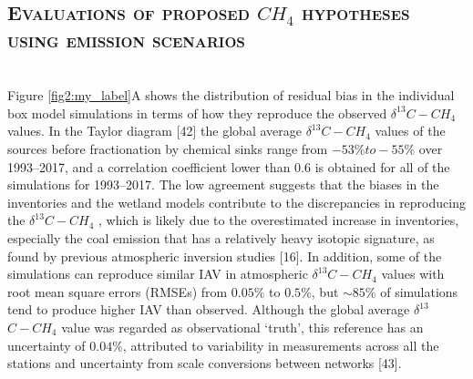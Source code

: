 \documentclass[a4paper,12pt]{article}
\begin{document}
\subsection*{\textbf{\textsc{\large{Evaluations of proposed $CH_{4}$ hypotheses using emission scenarios}}}}\\

\small{Figure \ref{fig2:my_label}A shows the distribution of residual bias in the individual box model simulations in terms of how they reproduce the observed $\delta^{13}$$C-CH_{4}$ values. In the Taylor diagram [42] the global average $\delta^{13}$$C-CH_{4}$ values of the sources before fractionation by chemical sinks range from $-53\% to -55\%$ over 1993–2017, and a correlation coefficient lower than 0.6 is obtained for all of the simulations for 1993–2017. The low agreement suggests that the biases in the inventories and the wetland models contribute to the discrepancies in reproducing the $\delta^{13}$$C-CH_{4}$ , which is likely due to the overestimated increase in inventories, especially the coal emission that has a relatively heavy isotopic signature, as found by previous atmospheric inversion studies [16]. In addition, some of the simulations can reproduce similar IAV in atmospheric $\delta^{13}$$C-CH_{4}$ values with root mean square errors (RMSEs) from $0.05\%$ to $0.5\%$, but $\sim 85\%$ of simulations tend to produce higher IAV than observed. Although the global average $\delta^{13}$$C-CH_{4}$ value was regarded as observational ‘truth’, this reference has an uncertainty of $0.04\%$, attributed to variability in measurements across all the stations and uncertainty from scale conversions between networks [43].}
\end{document}

